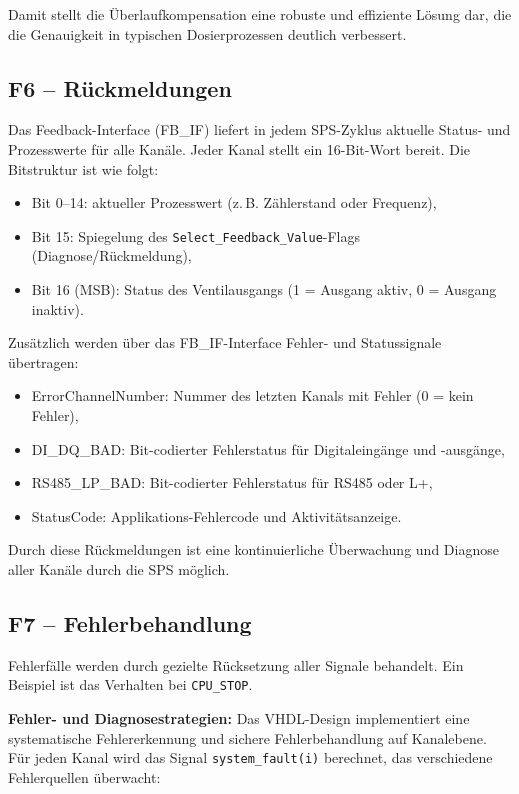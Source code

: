 Damit stellt die Überlaufkompensation eine robuste und effiziente Lösung dar, die die Genauigkeit in typischen Dosierprozessen deutlich verbessert.

\subsection*{F6 – Rückmeldungen}
  
Das Feedback-Interface (FB\_IF) liefert in jedem SPS-Zyklus aktuelle Status- und Prozesswerte für alle Kanäle.  
Jeder Kanal stellt ein 16-Bit-Wort bereit. Die Bitstruktur ist wie folgt:

\begin{itemize}
    \item Bit 0–14: aktueller Prozesswert (z.\,B. Zählerstand oder Frequenz),
    \item Bit 15: Spiegelung des \texttt{Select\_Feedback\_Value}-Flags (Diagnose/Rückmeldung),
    \item Bit 16 (MSB): Status des Ventilausgangs (1 = Ausgang aktiv, 0 = Ausgang inaktiv).
\end{itemize}

Zusätzlich werden über das FB\_IF-Interface Fehler- und Statussignale übertragen:

\begin{itemize}
    \item ErrorChannelNumber: Nummer des letzten Kanals mit Fehler (0 = kein Fehler),
    \item DI\_DQ\_BAD: Bit-codierter Fehlerstatus für Digitaleingänge und -ausgänge,
    \item RS485\_LP\_BAD: Bit-codierter Fehlerstatus für RS485 oder L+,
    \item StatusCode: Applikations-Fehlercode und Aktivitätsanzeige.
\end{itemize}

Durch diese Rückmeldungen ist eine kontinuierliche Überwachung und Diagnose aller Kanäle durch die SPS möglich.

\subsection*{F7 – Fehlerbehandlung}

Fehlerfälle werden durch gezielte Rücksetzung aller Signale behandelt. Ein Beispiel ist das Verhalten bei \texttt{CPU\_STOP}.

\textbf{Fehler- und Diagnosestrategien:}  
Das VHDL-Design implementiert eine systematische Fehlererkennung und sichere Fehlerbehandlung auf Kanalebene.  
Für jeden Kanal wird das Signal \texttt{system\_fault(i)} berechnet, das verschiedene Fehlerquellen überwacht:

